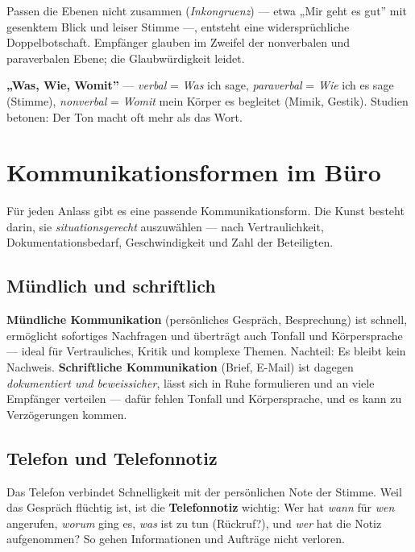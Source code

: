 \documentclass[11pt, a4paper]{article}
\begin{document}
\medskip
Passen die Ebenen nicht zusammen (\emph{Inkongruenz}) --- etwa „Mir geht es gut” mit
gesenktem Blick und leiser Stimme ---, entsteht eine widersprüchliche Doppelbotschaft.
Empfänger glauben im Zweifel der nonverbalen und paraverbalen Ebene; die Glaubwürdigkeit
leidet.

\begin{eselsbruecke}
\textbf{„Was, Wie, Womit”} --- \emph{verbal} = \emph{Was} ich sage, \emph{paraverbal} =
\emph{Wie} ich es sage (Stimme), \emph{nonverbal} = \emph{Womit} mein Körper es begleitet
(Mimik, Gestik). Studien betonen: Der Ton macht oft mehr als das Wort.
\end{eselsbruecke}

\section{Kommunikationsformen im Büro}

Für jeden Anlass gibt es eine passende Kommunikationsform. Die Kunst besteht darin, sie
\emph{situationsgerecht} auszuwählen --- nach Vertraulichkeit, Dokumentationsbedarf,
Geschwindigkeit und Zahl der Beteiligten.

\subsection{Mündlich und schriftlich}

\textbf{Mündliche Kommunikation} (persönliches Gespräch, Besprechung) ist schnell,
ermöglicht sofortiges Nachfragen und überträgt auch Tonfall und Körpersprache --- ideal
für Vertrauliches, Kritik und komplexe Themen. Nachteil: Es bleibt kein Nachweis.
\textbf{Schriftliche Kommunikation} (Brief, E-Mail) ist dagegen \emph{dokumentiert und
beweissicher}, lässt sich in Ruhe formulieren und an viele Empfänger verteilen ---
dafür fehlen Tonfall und Körpersprache, und es kann zu Verzögerungen kommen.

\subsection{Telefon und Telefonnotiz}

Das Telefon verbindet Schnelligkeit mit der persönlichen Note der Stimme. Weil das
Gespräch flüchtig ist, ist die \textbf{Telefonnotiz} wichtig: Wer hat \emph{wann} für
\emph{wen} angerufen, \emph{worum} ging es, \emph{was} ist zu tun (Rückruf?), und
\emph{wer} hat die Notiz aufgenommen? So gehen Informationen und Aufträge nicht verloren.
\end{document}

